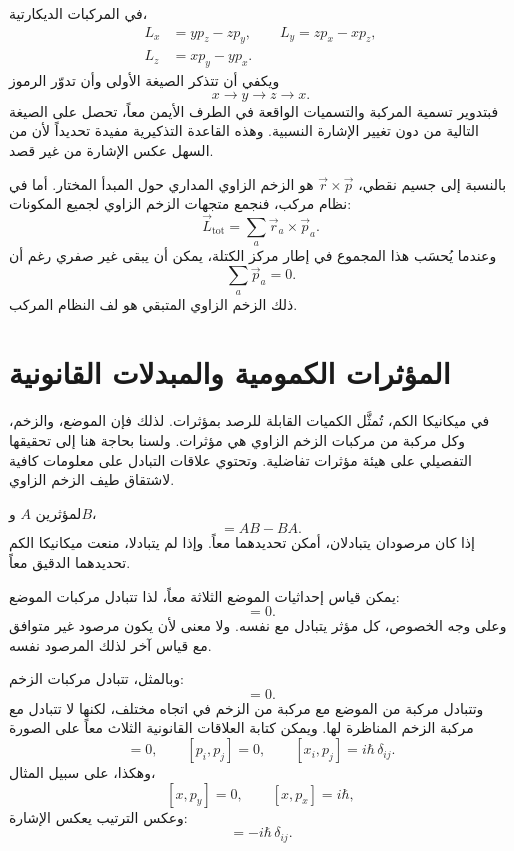 في المركبات الديكارتية،
\begin{equation}
\begin{aligned}
L_x&=yp_z-zp_y,\qquad
L_y=zp_x-xp_z,\\
L_z&=xp_y-yp_x.
\end{aligned}
\end{equation}
ويكفي أن تتذكر الصيغة الأولى وأن تدوّر الرموز
\[
x\longrightarrow y\longrightarrow z\longrightarrow x.
\]
فبتدوير تسمية المركبة والتسميات الواقعة في الطرف الأيمن معاً، تحصل على الصيغة التالية من دون تغيير الإشارة النسبية. وهذه القاعدة التذكيرية مفيدة تحديداً لأن من السهل عكس الإشارة من غير قصد.

بالنسبة إلى جسيم نقطي، \(\vec r\times\vec p\) هو الزخم الزاوي المداري حول المبدأ المختار. أما في نظام مركب، فنجمع متجهات الزخم الزاوي لجميع المكونات:
\begin{equation}
\vec L_{\mathrm{tot}}=\sum_a \vec r_a\times\vec p_a.
\end{equation}
وعندما يُحسَب هذا المجموع في إطار مركز الكتلة، يمكن أن يبقى غير صفري رغم أن
\[
\sum_a\vec p_a=0.
\]
ذلك الزخم الزاوي المتبقي هو لف النظام المركب.

\section{المؤثرات الكمومية والمبدلات القانونية}

في ميكانيكا الكم، تُمثَّل الكميات القابلة للرصد بمؤثرات. لذلك فإن الموضع، والزخم، وكل مركبة من مركبات الزخم الزاوي هي مؤثرات. ولسنا بحاجة هنا إلى تحقيقها التفصيلي على هيئة مؤثرات تفاضلية. وتحتوي علاقات التبادل على معلومات كافية لاشتقاق طيف الزخم الزاوي.

لمؤثرين \(A\) و\(B\)،
\begin{equation}
[A,B]=AB-BA.
\end{equation}
إذا كان مرصودان يتبادلان، أمكن تحديدهما معاً. وإذا لم يتبادلا، منعت ميكانيكا الكم تحديدهما الدقيق معاً.

يمكن قياس إحداثيات الموضع الثلاثة معاً، لذا تتبادل مركبات الموضع:
\begin{equation}
[x_i,x_j]=0.
\end{equation}
وعلى وجه الخصوص، كل مؤثر يتبادل مع نفسه. ولا معنى لأن يكون مرصود غير متوافق مع قياس آخر لذلك المرصود نفسه.

وبالمثل، تتبادل مركبات الزخم:
\begin{equation}
[p_i,p_j]=0.
\end{equation}
وتتبادل مركبة من الموضع مع مركبة من الزخم في اتجاه مختلف، لكنها لا تتبادل مع مركبة الزخم المناظرة لها. ويمكن كتابة العلاقات القانونية الثلاث معاً على الصورة
\begin{equation}
[x_i,x_j]=0,\qquad
[p_i,p_j]=0,\qquad
[x_i,p_j]=i\hbar\,\delta_{ij}.
\end{equation}
وهكذا، على سبيل المثال،
\[
[x,p_y]=0,\qquad [x,p_x]=i\hbar,
\]
وعكس الترتيب يعكس الإشارة:
\begin{equation}
[p_j,x_i]=-i\hbar\,\delta_{ij}.
\end{equation}

